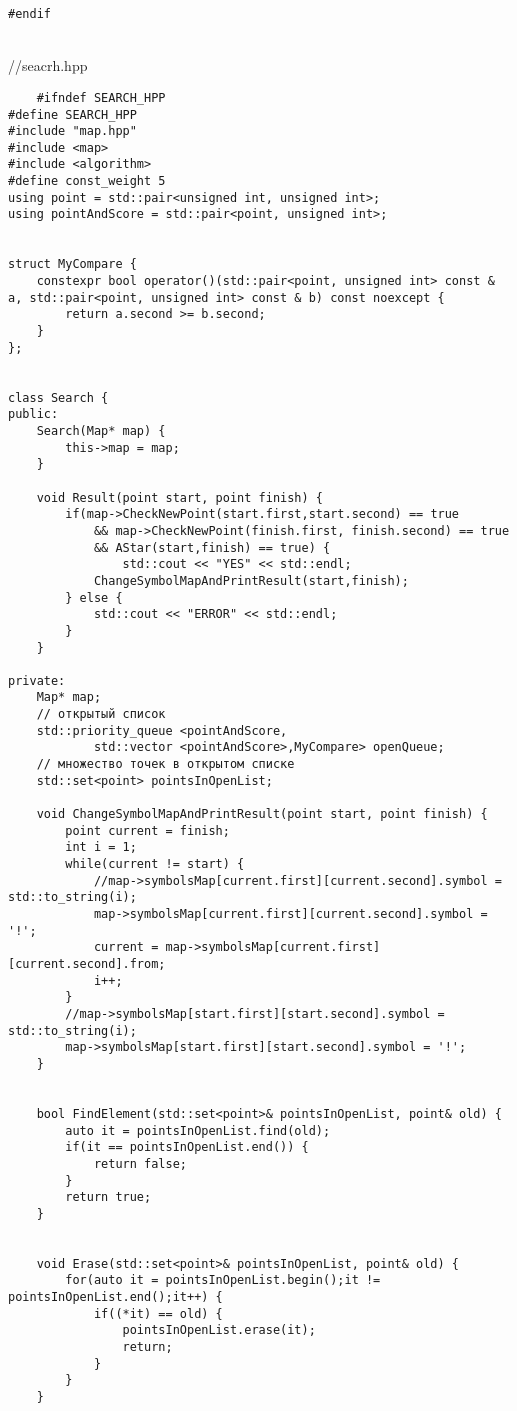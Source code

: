 \documentclass[12pt]{article}
\begin{document}
\begin{verbatim}
#endif
\end{verbatim}
\\
//seacrh.hpp
\begin{verbatim}
    #ifndef SEARCH_HPP
#define SEARCH_HPP
#include "map.hpp"
#include <map>
#include <algorithm>
#define const_weight 5 
using point = std::pair<unsigned int, unsigned int>;
using pointAndScore = std::pair<point, unsigned int>;


struct MyCompare {
    constexpr bool operator()(std::pair<point, unsigned int> const & a, std::pair<point, unsigned int> const & b) const noexcept {
        return a.second >= b.second;
    }
};


class Search {
public:
    Search(Map* map) {
        this->map = map;
    }

    void Result(point start, point finish) {
        if(map->CheckNewPoint(start.first,start.second) == true
            && map->CheckNewPoint(finish.first, finish.second) == true
            && AStar(start,finish) == true) {
                std::cout << "YES" << std::endl;
            ChangeSymbolMapAndPrintResult(start,finish);
        } else {
            std::cout << "ERROR" << std::endl;
        }
    }

private:
    Map* map;
    // открытый список
    std::priority_queue <pointAndScore,
            std::vector <pointAndScore>,MyCompare> openQueue;
    // множество точек в открытом списке
    std::set<point> pointsInOpenList;

    void ChangeSymbolMapAndPrintResult(point start, point finish) {
        point current = finish;
        int i = 1;
        while(current != start) {
            //map->symbolsMap[current.first][current.second].symbol = std::to_string(i);
            map->symbolsMap[current.first][current.second].symbol = '!';
            current = map->symbolsMap[current.first][current.second].from;
            i++;
        }
        //map->symbolsMap[start.first][start.second].symbol = std::to_string(i);
        map->symbolsMap[start.first][start.second].symbol = '!';
    }


    bool FindElement(std::set<point>& pointsInOpenList, point& old) {
        auto it = pointsInOpenList.find(old);
        if(it == pointsInOpenList.end()) {
            return false;
        }
        return true;
    }


    void Erase(std::set<point>& pointsInOpenList, point& old) {
        for(auto it = pointsInOpenList.begin();it != pointsInOpenList.end();it++) {
            if((*it) == old) {
                pointsInOpenList.erase(it);
                return;
            }
        }
    }



\end{verbatim}
\end{document}
